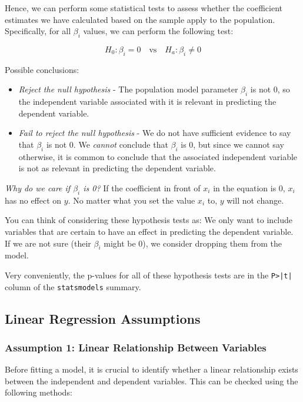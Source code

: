 \documentclass{article}
\theoremstyle{definition}
\theoremstyle{theorem}
\theoremstyle{theorem}
\theoremstyle{theorem}
\theoremstyle{theorem}
\theoremstyle{definition}
\theoremstyle{definition}
\theoremstyle{definition}
\theoremstyle{definition}
\theoremstyle{definition}
\begin{document}
Hence, we can perform some statistical tests to assess whether the coefficient estimates we have calculated based on the sample apply to the population. Specifically, for all $\beta_i$ values, we can perform the following test:

$$
H_0: \beta_i = 0 \quad \text{vs} \quad H_a: \beta_i \neq 0
$$

Possible conclusions:
\begin{itemize}
    \item \textit{Reject the null hypothesis} - The population model parameter $\beta_i$ is not 0, so the independent variable associated with it is relevant in predicting the dependent variable.
    \item \textit{Fail to reject the null hypothesis} - We do not have sufficient evidence to say that $\beta_i$ is not 0. We \textit{cannot} conclude that $\beta_i$ is 0, but since we cannot say otherwise, it is common to conclude that the associated independent variable is not as relevant in predicting the dependent variable.
\end{itemize}

\textit{Why do we care if $\beta_i$ is 0?} If the coefficient in front of $x_i$ in the equation is 0, $x_i$ has no effect on $y$. No matter what you set the value $x_i$ to, $y$ will not change.

You can think of considering these hypothesis tests as: We only want to include variables that are certain to have an effect in predicting the dependent variable. If we are not sure (their $\beta_i$ might be 0), we consider dropping them from the model.

Very conveniently, the p-values for all of these hypothesis tests are in the \texttt{P>|t|} column of the \texttt{statsmodels} summary.

\subsection{Linear Regression Assumptions}

\subsubsection*{Assumption 1: Linear Relationship Between Variables}

Before fitting a model, it is crucial to identify whether a linear relationship exists between the independent and dependent variables. This can be checked using the following methods:
\end{document}

